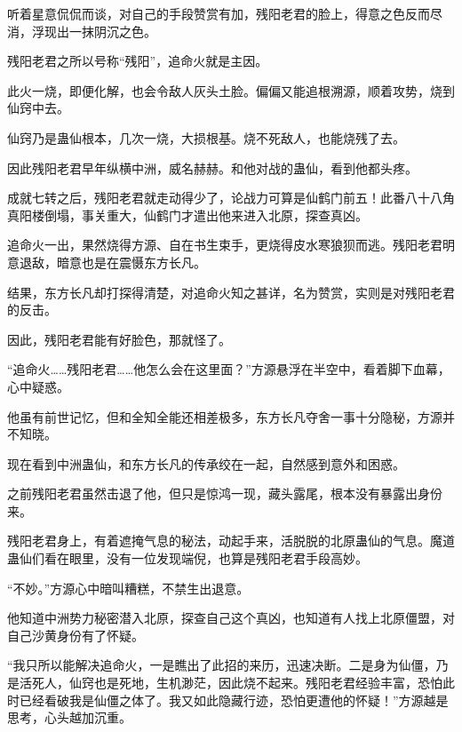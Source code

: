 \begin{this_body}
听着星意侃侃而谈，对自己的手段赞赏有加，残阳老君的脸上，得意之色反而尽消，浮现出一抹阴沉之色。

残阳老君之所以号称“残阳”，追命火就是主因。

此火一烧，即便化解，也会令敌人灰头土脸。偏偏又能追根溯源，顺着攻势，烧到仙窍中去。

仙窍乃是蛊仙根本，几次一烧，大损根基。烧不死敌人，也能烧残了去。

因此残阳老君早年纵横中洲，威名赫赫。和他对战的蛊仙，看到他都头疼。

成就七转之后，残阳老君就走动得少了，论战力可算是仙鹤门前五！此番八十八角真阳楼倒塌，事关重大，仙鹤门才遣出他来进入北原，探查真凶。

追命火一出，果然烧得方源、自在书生束手，更烧得皮水寒狼狈而逃。残阳老君明意退敌，暗意也是在震慑东方长凡。

结果，东方长凡却打探得清楚，对追命火知之甚详，名为赞赏，实则是对残阳老君的反击。

因此，残阳老君能有好脸色，那就怪了。

“追命火……残阳老君……他怎么会在这里面？”方源悬浮在半空中，看着脚下血幕，心中疑惑。

他虽有前世记忆，但和全知全能还相差极多，东方长凡夺舍一事十分隐秘，方源并不知晓。

现在看到中洲蛊仙，和东方长凡的传承绞在一起，自然感到意外和困惑。

之前残阳老君虽然击退了他，但只是惊鸿一现，藏头露尾，根本没有暴露出身份来。

残阳老君身上，有着遮掩气息的秘法，动起手来，活脱脱的北原蛊仙的气息。魔道蛊仙们看在眼里，没有一位发现端倪，也算是残阳老君手段高妙。

“不妙。”方源心中暗叫糟糕，不禁生出退意。

他知道中洲势力秘密潜入北原，探查自己这个真凶，也知道有人找上北原僵盟，对自己沙黄身份有了怀疑。

“我只所以能解决追命火，一是瞧出了此招的来历，迅速决断。二是身为仙僵，乃是活死人，仙窍也是死地，生机渺茫，因此烧不起来。残阳老君经验丰富，恐怕此时已经看破我是仙僵之体了。我又如此隐藏行迹，恐怕更遭他的怀疑！”方源越是思考，心头越加沉重。

\end{this_body}

